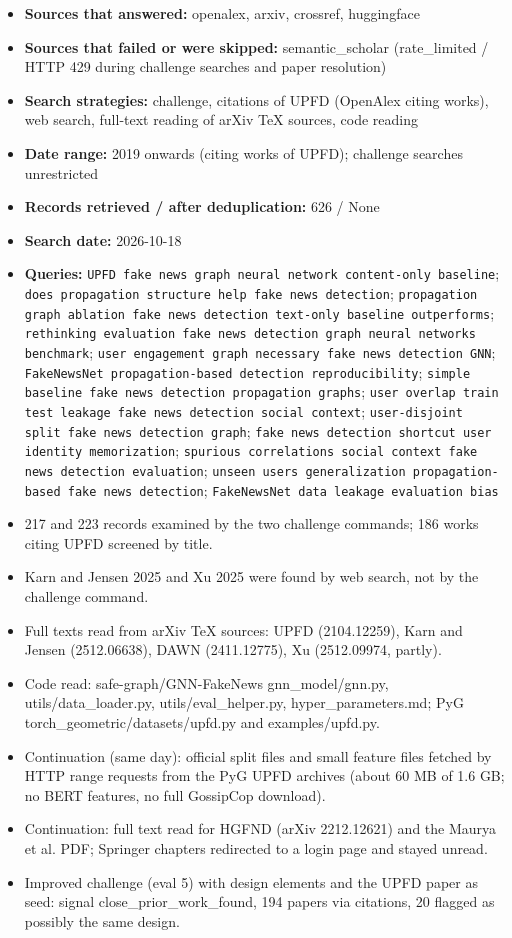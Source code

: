 \documentclass[11pt,a4paper]{article}
\begin{document}
\begin{itemize}
\item \textbf{Sources that answered:} openalex, arxiv, crossref, huggingface
\item \textbf{Sources that failed or were skipped:} semantic\_scholar (rate\_limited / HTTP 429 during challenge searches and paper resolution)
\item \textbf{Search strategies:} challenge, citations of UPFD (OpenAlex citing works), web search, full-text reading of arXiv TeX sources, code reading
\item \textbf{Date range:} 2019 onwards (citing works of UPFD); challenge searches unrestricted
\item \textbf{Records retrieved / after deduplication:} 626 / None
\item \textbf{Search date:} 2026-10-18
\item \textbf{Queries:} \texttt{UPFD fake news graph neural network content-only baseline}; \texttt{does propagation structure help fake news detection}; \texttt{propagation graph ablation fake news detection text-only baseline outperforms}; \texttt{rethinking evaluation fake news detection graph neural networks benchmark}; \texttt{user engagement graph necessary fake news detection GNN}; \texttt{FakeNewsNet propagation-based detection reproducibility}; \texttt{simple baseline fake news detection propagation graphs}; \texttt{user overlap train test leakage fake news detection social context}; \texttt{user-disjoint split fake news detection graph}; \texttt{fake news detection shortcut user identity memorization}; \texttt{spurious correlations social context fake news detection evaluation}; \texttt{unseen users generalization propagation-based fake news detection}; \texttt{FakeNewsNet data leakage evaluation bias}
\item 217 and 223 records examined by the two challenge commands; 186 works citing UPFD screened by title.
\item Karn and Jensen 2025 and Xu 2025 were found by web search, not by the challenge command.
\item Full texts read from arXiv TeX sources: UPFD (2104.12259), Karn and Jensen (2512.06638), DAWN (2411.12775), Xu (2512.09974, partly).
\item Code read: safe-graph/GNN-FakeNews gnn\_model/gnn.py, utils/data\_loader.py, utils/eval\_helper.py, hyper\_parameters.md; PyG torch\_geometric/datasets/upfd.py and examples/upfd.py.
\item Continuation (same day): official split files and small feature files fetched by HTTP range requests from the PyG UPFD archives (about 60 MB of 1.6 GB; no BERT features, no full GossipCop download).
\item Continuation: full text read for HGFND (arXiv 2212.12621) and the Maurya et al. PDF; Springer chapters redirected to a login page and stayed unread.
\item Improved challenge (eval 5) with design elements and the UPFD paper as seed: signal close\_prior\_work\_found, 194 papers via citations, 20 flagged as possibly the same design.
\end{itemize}
\end{document}
